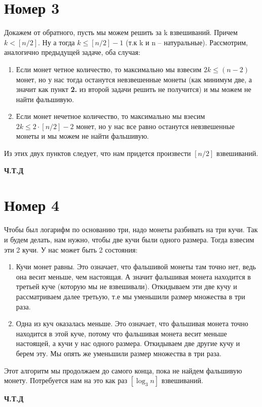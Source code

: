 \documentclass[a4paper,12pt]{article}
\begin{document}
\section*{Номер 3}
Докажем от обратного, пусть мы можем решить за k взвешиваний. Причем $k < [n / 2]$. Ну а тогда $k \leq [n / 2] - 1$ (т.к  k  и n -- натуральные). Рассмотрим, аналогично предыдущей задаче, оба случая:
\begin{enumerate}
\item Если монет четное количество, то максимально мы взвесим $2k \leq (n - 2)$ монет, но у нас тогда останутся невзвешенные монеты  (как минимум две, а значит как пункт \textbf{2.} из второй задачи решить не получится) и мы можем не найти фальшивую. 
\item Если монет нечетное количество, то максимально мы взесим $2k \leq 2 \cdot [n / 2] - 2$ монет, но у нас все равно останутся невзвешенные монеты и мы можем не найти фальшивую.
\end{enumerate}
Из этих двух пунктов следует, что нам придется произвести $[n / 2]$ взвешиваний.
\begin{center}
\textbf{Ч.Т.Д} 
\end{center}
\section*{Номер 4}
Чтобы был логарифм по основанию три, надо монеты разбивать на три кучи. Так и будем делать, нам нужно, чтобы две кучи были одного размера. Тогда взвесим эти 2 кучи. У нас может быть 2 состояния:
\begin{enumerate}
\item
Кучи монет равны. Это означает, что фальшивой монеты там точно нет, ведь она весит меньше, чем настоящая. А значит фальшивая монета находится в третьей куче (которую мы не взвешивали). Откидываем эти две кучу и рассматриваем далее третьую, т.е мы уменьшили размер множества в три раза. 
\item Одна из куч оказалась меньше. Это означает, что фальшивая монета точно находится в этой куче, потому что фальшивая монета весит меньше настоящей, а кучи у нас одного размера. Откидываем две другие кучу и берем эту. Мы опять же уменьшили размер множества в три раза.
\end{enumerate}
Этот алгоритм мы продолжаем до самого конца, пока не найдем фальшивую монету. Потребуется нам на это как раз $\left[\log_3 n\right]$ взвешиваний.
\begin{center}
\textbf{Ч.Т.Д}
\end{center}
\end{document}
